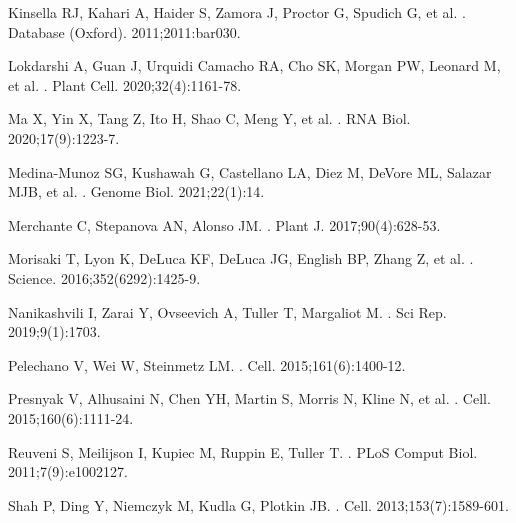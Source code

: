 \documentclass[10pt,letterpaper]{article}
\begin{document}
\begin{thebibliography}{10}
Kinsella RJ, Kahari A, Haider S, Zamora J, Proctor G, Spudich G, et al.
.
\newblock Database (Oxford). 2011;2011:bar030. 

Lokdarshi A, Guan J, Urquidi Camacho RA, Cho SK, Morgan PW, Leonard M, et al.
.
\newblock Plant Cell. 2020;32(4):1161-78.

Ma X, Yin X, Tang Z, Ito H, Shao C, Meng Y, et al.
.
\newblock RNA Biol. 2020;17(9):1223-7.

Medina-Munoz SG, Kushawah G, Castellano LA, Diez M, DeVore ML, Salazar MJB, et al.
.
\newblock Genome Biol. 2021;22(1):14.

Merchante C, Stepanova AN, Alonso JM.
.
\newblock Plant J. 2017;90(4):628-53.

Morisaki T, Lyon K, DeLuca KF, DeLuca JG, English BP, Zhang Z, et al.
.
\newblock Science. 2016;352(6292):1425-9.

Nanikashvili I, Zarai Y, Ovseevich A, Tuller T, Margaliot M.
.
\newblock Sci Rep. 2019;9(1):1703.

Pelechano V, Wei W, Steinmetz LM.
.
\newblock Cell. 2015;161(6):1400-12.

Presnyak V, Alhusaini N, Chen YH, Martin S, Morris N, Kline N, et al.
.
\newblock Cell. 2015;160(6):1111-24.

Reuveni S, Meilijson I, Kupiec M, Ruppin E, Tuller T.
.
\newblock PLoS Comput Biol. 2011;7(9):e1002127.

Shah P, Ding Y, Niemczyk M, Kudla G, Plotkin JB.
.
\newblock Cell. 2013;153(7):1589-601.


\end{thebibliography}
\end{document}
